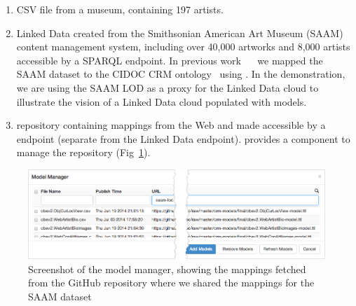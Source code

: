 \begin{enumerate}
\item CSV file from a museum, containing 197 artists. %
\item Linked Data created from the Smithsonian American Art Museum (SAAM) content management system, including over 40,000 artworks and 8,000 artists accessible by a SPARQL endpoint. 
In previous work~\cite{Szekely:2013vq} ~ we mapped the SAAM dataset to the CIDOC CRM ontology~\cite{Doerr:2003:CCR:958671.958678} using \rtworml.
In the demonstration, we are using the SAAM LOD as a proxy for the Linked Data cloud to illustrate the vision of a Linked Data cloud populated with \rtworml models.
\item \rtworml repository containing \rtworml mappings from the Web and made accessible by a \sparql endpoint (separate from the Linked Data endpoint).
\karma provides a component to manage the \rtworml repository (Fig~\ref{fig:model-manager-screenshot}).
\end{enumerate}
\begin{figure}[begin]
\centering
\includegraphics[width=4.8in]{images/3-model-manager.png}
\vspace{-5mm}
\caption{Screenshot of the model manager, showing the \rtworml mappings fetched from the GitHub repository where we shared the mappings for the SAAM dataset}
\vspace{-2mm}
\label{fig:model-manager-screenshot}
\vspace{-1.5em}
\end{figure}